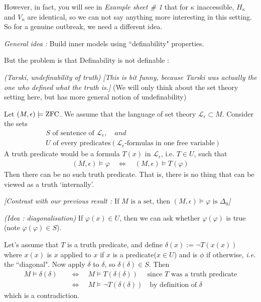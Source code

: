 \documentclass[12pt,a4paper]{article}
\newenvironment{proof}
{\begin{changemargin}{0.5cm}{0.5cm} 
	}%
	{\end{changemargin}
}
\newenvironment{p}
{\begin{proof} 
	}%
	{\end{proof}
}
\begin{document}
However, in fact, you will see in \emph{Example sheet \# 1} that for $\kappa$ inaccessible, $H_{\kappa}$ and $V_{\kappa}$ are identical, so we can not say anything more interesting in this setting. So for a genuine outbreak, we need a different idea.
\s

\emph{General idea :} Build inner models using ``definability" properties.
\s

But the problem is that Definability is not definable :
\s

\thm \emph{(Tarski, undefinability of truth)} \emph{[This is bit funny, because Tarski was actually the one who defined what the truth is.]} (We will only think about the set theory setting here, but has more general notion of undefinability)

\quad Let $(M, \epsilon) \models \text{ZFC}$. We assume that the language of set theory $\mathscr{L}_{\epsilon} \subset M$. Consider the sets
\begin{align*}
&S \text{ of sentence of } \mathscr{L}_{\epsilon}, \quad \textit{and} \\
&U \text{ of every predicates} (\mathscr{L}_{\epsilon} \text{-formulas in one free variable})
\end{align*}
A truth predicate would be a formula $T(x)$ in $\mathscr{L}_{\epsilon}$, i.e. $T\in U$, such that
\begin{align*}
(M, \epsilon) \models \varphi \quad \Leftrightarrow \quad (M, \epsilon) \models T(\varphi)
\end{align*}
Then there can be no such truth predicate. That is, there is no thing that can be viewed as a truth `internally'.

\quad \emph{[Contrast with our previous result : $\text{If } M \text{ is a set, then } (M, \epsilon) \models \varphi \text{ is } \Delta_0$]}
\begin{p}
\pf \emph{(Idea : diagonalisation)} If $\varphi(x) \in U$, then we can ask whether $\varphi(\varphi)$ is true (note $\varphi(\varphi) \in S$).

\quad Let's assume that $T$ is a truth predicate, and define $\delta(x) := \neg T(x(x))$ where $x(x)$ is $x$ applied to $x$ if $x$ is a predicate($x\in U$) and is $\phi$ if otherwise, \textit{i.e.} the ``diagonal". Now apply $\delta$ to $\delta$, so $\delta(\delta) \in S$. Then
\begin{align*}
M \models \delta(\delta) \quad &\Leftrightarrow \quad M \models T(\delta(\delta)) \quad \text{ since } T \text{ was a truth predicate} \\
&\Leftrightarrow \quad  M \models \neg T(\delta(\delta)) \quad \text{by definition of } \delta
\end{align*}
which is a contradiction.

\eop
\end{p}
\s
\end{document}

